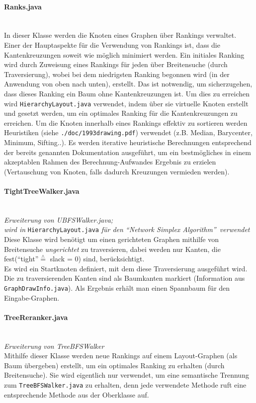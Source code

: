 \documentclass[10pt,a4paper]{article}
\begin{document}
\paragraph{Ranks.java}\ \\
{\footnotesize In dieser Klasse werden die Knoten eines Graphen über Rankings verwaltet. Einer der Hauptaspekte für die Verwendung von Rankings ist, dass die Kantenkreuzungen soweit wie möglich minimiert werden. Ein initiales Ranking wird durch Zuweisung eines Rankings für jeden über Breitensuche (durch Traversierung), wobei bei dem niedrigsten Ranking begonnen wird (in der Anwendung von oben nach unten), erstellt. Das ist notwendig, um sicherzugehen, dass dieses Ranking ein Baum ohne Kantenkreuzungen ist. Um dies zu erreichen wird \texttt{HierarchyLayout.java} verwendet, indem über sie virtuelle Knoten erstellt und gesetzt werden, um ein optimales Ranking für die Kantenkreuzungen zu erreichen. Um die Knoten innerhalb eines Rankings effektiv zu sortieren werden Heuristiken (siehe \texttt{./doc/1993drawing.pdf}) verwendet (z.B. Median, Barycenter, Minimum, Sifting..). Es werden iterative heuristische Berechnungen entsprechend der bereits genannten Dokumentation ausgeführt, um ein bestmögliches in einem akzeptablen Rahmen des Berechnung-Aufwandes Ergebnis zu erzielen (Vertauschung von Knoten, falls dadurch Kreuzungen vermieden werden).}

\paragraph{TightTreeWalker.java}\ \\
\textit{Erweiterung von UBFSWalker.java;\\ wird in} {\small \texttt{HierarchyLayout.java}} \textit{für den "`Network Simplex Algorithm"'\ verwendet}\\
{\footnotesize Diese Klasse wird benötigt um einen gerichteten Graphen mithilfe von Breitensuche \textit{ungerichtet} zu traversieren, dabei werden nur Kanten, die fest("`tight"'$\overset{\wedge}{=}$ slack = 0) sind, berücksichtigt. \\
Es wird ein Startknoten definiert, mit dem diese Traversierung ausgeführt wird. Die zu traversierenden Kanten sind als Baumkanten markiert (Information aus \texttt{GraphDrawInfo.java}). Als Ergebnis erhält man einen Spannbaum für den Eingabe-Graphen.}

\paragraph{TreeReranker.java}\ \\
\emph{Erweiterung von TreeBFSWalker}\\
{\footnotesize Mithilfe dieser Klasse werden neue Rankings auf einem Layout-Graphen (als Baum übergeben) erstellt, um ein optimales Ranking zu erhalten (durch Breitensuche). Sie wird eigentlich nur verwendet, um eine semantische Trennung zum \texttt{TreeBFSWalker.java} zu erhalten, denn jede verwendete Methode ruft eine entsprechende Methode aus der Oberklasse auf.}
\end{document}
